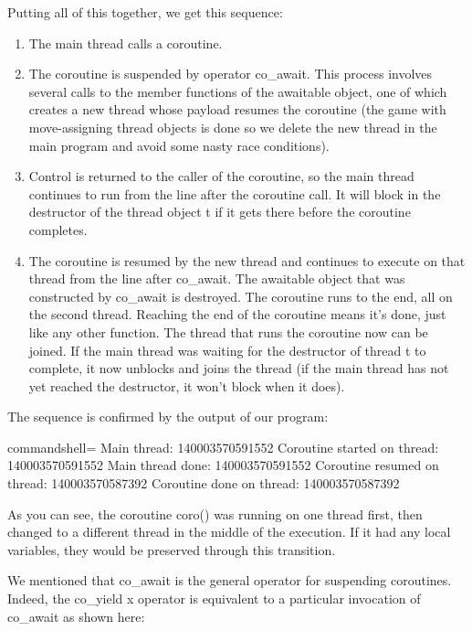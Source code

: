 Putting all of this together, we get this sequence:

\begin{enumerate}
\item
The main thread calls a coroutine.

\item
The coroutine is suspended by operator co\_await. This process involves several calls to the member functions of the awaitable object, one of which creates a new thread whose payload resumes the coroutine (the game with move-assigning thread objects is done so we delete the new thread in the main program and avoid some nasty race conditions).

\item
Control is returned to the caller of the coroutine, so the main thread continues to run from the line after the coroutine call. It will block in the destructor of the thread object t if it gets there before the coroutine completes.

\item 
The coroutine is resumed by the new thread and continues to execute on that thread from the line after co\_await. The awaitable object that was constructed by co\_await is destroyed. The coroutine runs to the end, all on the second thread. Reaching the end of the coroutine means it's done, just like any other function. The thread that runs the coroutine now can be joined. If the main thread was waiting for the destructor of thread t to complete, it now unblocks and joins the thread (if the main thread has not yet reached the destructor, it won't block when it does). 
\end{enumerate}

The sequence is confirmed by the output of our program:

\begin{tcblisting}{commandshell={}}
Main thread: 140003570591552
Coroutine started on thread: 140003570591552
Main thread done: 140003570591552
Coroutine resumed on thread: 140003570587392
Coroutine done on thread: 140003570587392
\end{tcblisting}

As you can see, the coroutine coro() was running on one thread first, then changed to a different thread in the middle of the execution. If it had any local variables, they would be preserved through this transition.

We mentioned that co\_await is the general operator for suspending coroutines. Indeed, the co\_yield x operator is equivalent to a particular invocation of co\_await as shown here:

